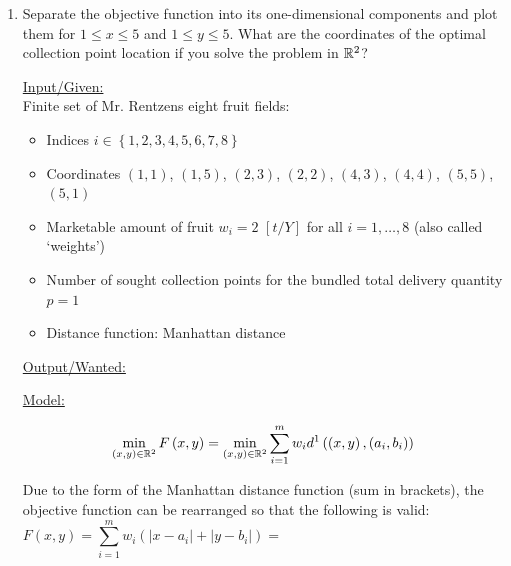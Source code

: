 \begin{enumerate}
	\item Separate the objective function into its one-dimensional components and plot them for $1 \leq x\leq 5$ and $1\leq y\leq 5$. What are the coordinates of the optimal collection point location if you solve the problem in $\mathbb{R}^2$?
	\begin{solution}
	
	\uline{Input/Given:}\\
	 Finite set of  Mr. Rentzens eight fruit fields:\\
		\begin{itemize}
			\item Indices $i\in\left\{1,2,3,4,5,6,7,8\right\}$
			\item Coordinates $\left(1,1\right)$, $\left(1,5\right)$, $\left(2,3\right)$, $\left(2,2\right)$, $\left(4,3\right)$, $\left(4,4\right)$, $\left(5,5\right)$, $\left(5,1\right)$			
			\item Marketable amount of fruit $w_i=2$ $\left[t/Y\right]$ for all $i=1,\ldots,8$ (also called `weights')
			\item Number of sought collection points for the bundled total delivery quantity $p=1$
			\item Distance function: Manhattan distance
		\end{itemize}
	\uline{Output/Wanted:}\\
\phantom{	A location in $(x,y) \in \R^2$ such that the sum of the $w_i$ weighted distances between the collection locations and the collection point is minimal}
	
	\underline{Model:}

		$$\min_{(x,y)\in\mathbb{R}^2} F\left(x,y\right)=\min_{(x,y)\in\mathbb{R}^2} \sum_{i=1}^m w_i d^1\left(\left(x,y\right),\left(a_i,b_i\right)\right)$$
		
		Due to the form of the Manhattan distance function (sum in brackets), the objective function can be rearranged so that the following is valid:\\
		
	\[F\left(x,y\right)=\sum_{i=1}^m w_i \left(\left|x-a_i\right|+\left|y-b_i\right|\right)=\phantom{\sum_{i=1}^m w_i \left(\left|x-a_i\right|\right)+\sum_{i=1}^m w_i \left(\left|y-b_i\right|\right)=F_1\left(x\right)+F_2\left(y\right)}
\]
			

\end{solution}
\end{enumerate}
